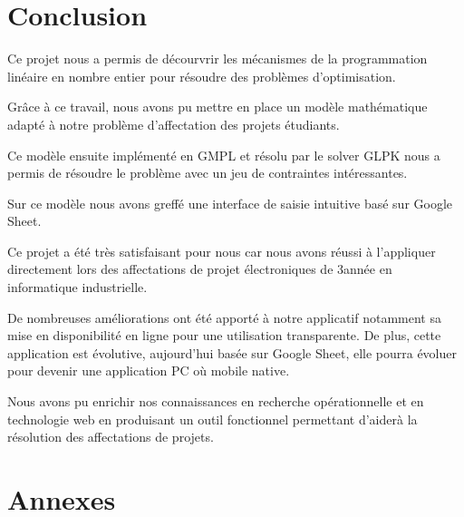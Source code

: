\documentclass[final,poster]{polytech/polytech}
\begin{document}

\chapter*{Conclusion}

Ce projet nous a permis de décourvrir les mécanismes de la programmation linéaire en nombre entier pour résoudre des problèmes d'optimisation. 

Grâce à ce travail, nous avons pu mettre en place un modèle mathématique adapté à notre problème d'affectation des projets étudiants. 

Ce modèle ensuite implémenté en GMPL et résolu par le solver GLPK nous a permis de résoudre le problème avec un jeu de contraintes intéressantes.

Sur ce modèle nous avons greffé une interface de saisie intuitive basé sur Google Sheet.

Ce projet a été très satisfaisant pour nous car nous avons réussi à l'appliquer directement lors des affectations de projet électroniques de 3\ieme année en informatique industrielle.

De nombreuses améliorations ont été apporté à notre applicatif notamment sa mise en disponibilité en ligne pour une utilisation transparente. 
De plus, cette application est évolutive, aujourd'hui basée sur Google Sheet, elle pourra évoluer pour devenir une application PC où mobile native.

Nous avons pu enrichir nos connaissances en recherche opérationnelle et en technologie web en produisant un outil fonctionnel permettant d'aiderà la résolution des affectations de projets.






\chapter*{Annexes}


\end{document}
